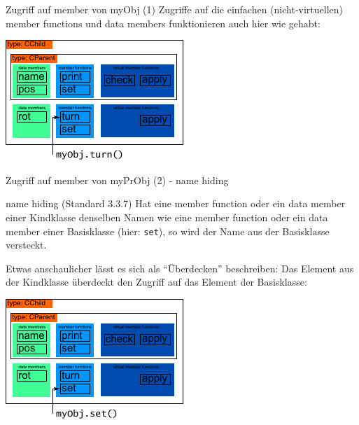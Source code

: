 \begin{frame}[fragile,b]{Zugriff auf member von myObj (1)}
	Zugriffe auf die einfachen (nicht-virtuellen) member functions und data members funktionieren auch hier wie gehabt:
	
	\vspace{2em}
	
	\includegraphics[width=0.5\linewidth]{images/myObj-turn}
\end{frame}

\begin{frame}[fragile,b]{Zugriff auf member von myPrObj (2) - name hiding}
	\footnotesize
	\begin{block}{name hiding (Standard 3.3.7)}
		Hat eine member function oder ein data member einer Kindklasse denselben Namen wie eine member function oder ein data member einer Basisklasse (hier: \verb|set|), so wird der Name aus der Basisklasse versteckt.
	\end{block}
	
	Etwas anschaulicher lässt es sich als \enquote{Überdecken} beschreiben: Das Element aus der Kindklasse überdeckt den Zugriff auf das Element der Basisklasse:
	
	\vspace{0.75em}
	
	\includegraphics[width=0.5\linewidth]{images/myObj-hidingSet}
\end{frame}

